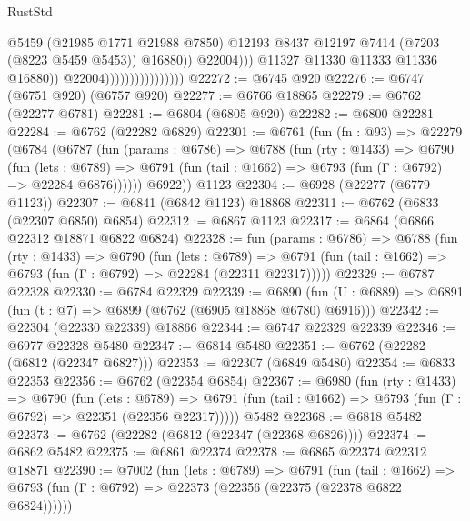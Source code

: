 \begin{lexlean}{RustStd}
\begin{coremodule}
                                                  @5459
                                                  (@21985 @1771 @21988 @7850)
                                                  @12193
                                                  @8437
                                                  @12197
                                                  @7414
                                                  (@7203 (@8223 @5459 @5453))
                                                  @16880))
                                              @22004)))
                                        @11327
                                        @11330
                                        @11333
                                        @11336
                                        @16880))
                                    @22004))))))))))))))))
@22272 := @6745 @920
@22276 := @6747 (@6751 @920) (@6757 @920)
@22277 := @6766 @18865
@22279 := @6762 (@22277 @6781)
@22281 := @6804 (@6805 @920)
@22282 := @6800 @22281
@22284 := @6762 (@22282 @6829)
@22301 := @6761
    (fun (fn : @93) =>
    @22279
      (@6784
        (@6787
          (fun (params : @6786) =>
          @6788
            (fun (rty : @1433) =>
            @6790
              (fun (lets : @6789) =>
              @6791 (fun (tail : @1662) => @6793 (fun (Γ : @6792) => @22284 @6876))))))
        @6922))
    @1123
@22304 := @6928 (@22277 (@6779 @1123))
@22307 := @6841 (@6842 @1123) @18868
@22311 := @6762 (@6833 (@22307 @6850) @6854)
@22312 := @6867 @1123
@22317 := @6864 (@6866 @22312 @18871 @6822 @6824)
@22328 := fun (params : @6786) =>
  @6788
    (fun (rty : @1433) =>
    @6790
      (fun (lets : @6789) =>
      @6791 (fun (tail : @1662) => @6793 (fun (Γ : @6792) => @22284 (@22311 @22317)))))
@22329 := @6787 @22328
@22330 := @6784 @22329
@22339 := @6890
    (fun (U : @6889) => @6891 (fun (t : @7) => @6899 (@6762 (@6905 @18868 @6780) @6916)))
@22342 := @22304 (@22330 @22339) @18866
@22344 := @6747 @22329 @22339
@22346 := @6977 @22328 @5480
@22347 := @6814 @5480
@22351 := @6762 (@22282 (@6812 (@22347 @6827)))
@22353 := @22307 (@6849 @5480)
@22354 := @6833 @22353
@22356 := @6762 (@22354 @6854)
@22367 := @6980
    (fun (rty : @1433) =>
    @6790
      (fun (lets : @6789) =>
      @6791 (fun (tail : @1662) => @6793 (fun (Γ : @6792) => @22351 (@22356 @22317)))))
    @5482
@22368 := @6818 @5482
@22373 := @6762 (@22282 (@6812 (@22347 (@22368 @6826))))
@22374 := @6862 @5482
@22375 := @6861 @22374
@22378 := @6865 @22374 @22312 @18871
@22390 := @7002
    (fun (lets : @6789) =>
    @6791
      (fun (tail : @1662) =>
      @6793 (fun (Γ : @6792) => @22373 (@22356 (@22375 (@22378 @6822 @6824))))))

\end{coremodule}
\end{lexlean}
